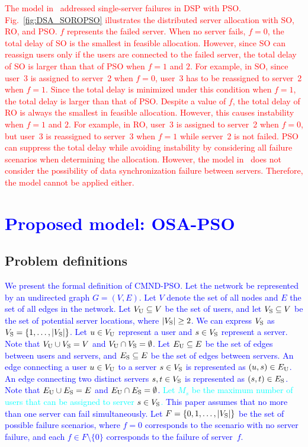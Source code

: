 \documentclass[10pt, letterpaper]{IEEEtran}
\newcommand\blue[1]{\textcolor{blue}{#1}}
\newcommand\red[1]{\textcolor{red}{#1}}
\newcommand\cyan[1]{\textcolor{cyan}{#1}}
\begin{document}
\begin{CJK}{UTF8}{ipxm}
\red{
The model in~\cite{5_9_Masuda2020} addressed single-server failures in DSP with PSO.
Fig.~\ref{fig:DSA_SOROPSO} illustrates the distributed server allocation with SO, RO, and PSO.
$f$ represents the failed server.
When no server fails, $f = 0$, the total delay of SO is the smallest in feasible allocation.
However, since SO can reassign users only if the users are connected to the failed server, the total delay of SO is larger than that of PSO when $f = 1$ and $2$.
For example, in SO, since user~3 is assigned to server~2 when $f = 0$, user~3 has to be reassigned to server~2 when $f = 1$.
Since the total delay is minimized under this condition when $f = 1$, the total delay is larger than that of PSO.
Despite a value of $f$, the total delay of RO is always the smallest in feasible allocation.
However, this causes instability when $f = 1$ and $2$.
For example, in RO, user~3 is assigned to server~2 when $f = 0$, but user~3 is reassigned to server~3 when $f = 1$ while server~2 is not failed.
PSO can suppress the total delay while avoiding instability by considering all failure scenarios when determining the allocation.
However, the model in~\cite{5_9_Masuda2020} does not consider the possibility of data synchronization failure between servers.
Therefore, the model cannot be applied either.
}

\section{\blue{Proposed model: OSA-PSO}}
\label{sec:proposed_mode_cmnd_pso}

\subsection{Problem definitions}

\blue{
We present the formal definition of CMND-PSO. Let the network be represented by an undirected graph $G = (V, E)$.
Let $V$ denote the set of all nodes and $E$ the set of all edges in the network.
Let $V_{\rm{U}} \subseteq V$ be the set of users, and let $V_{\rm{S}} \subseteq V$ be the set of potential server locations, where $|V_{\rm{S}}| \geq 2$.
We can express $V_{\rm{S}}$ as $V_{\rm{S}} = \{1, \ldots, |V_{\rm{S}}|\}$.
Let $u \in V_{\rm{U}}$ represent a user and $s \in V_{\rm{S}}$ represent a server.
Note that $V_{\rm{U}} \cup V_{\rm{S}} = V$ and $V_{\rm{U}} \cap V_{\rm{S}} = \emptyset$.
Let $E_{\rm{U}} \subseteq E$ be the set of edges between users and servers, and $E_{\rm{S}} \subseteq E$ be the set of edges between servers.
An edge connecting a user $u \in V_{\rm{U}}$ to a server $s \in V_{\rm{S}}$ is represented as $(u,s) \in E_{\rm{U}}$.
An edge connecting two distinct servers $s, t \in V_{\rm{S}}$ is represented as $(s, t) \in E_{\rm{S}}$.
Note that $E_{\rm U} \cup E_{\rm S} =E$ and $E_{\rm{U}} \cap E_{\rm{S}} = \emptyset$.
\cyan{Let $M_s$ be the maximum number of users that can be assigned to server $s \in V_{\rm{S}}$.}
This paper assumes that no more than one server can fail simultaneously.
Let $F = \{0, 1, \ldots, |V_{\rm{S}}|\}$ be the set of possible failure scenarios, where $f = 0$ corresponds to the scenario with no server failure, and each $f \in F \setminus \{0\}$ corresponds to the failure of server~$f$.
}


\end{CJK}
\end{document}
